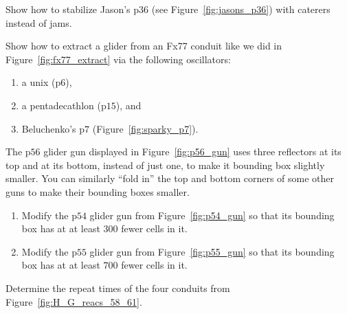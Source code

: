 \begin{multicols}{2}
\begin{problem}\label{exer:jasons_p36_caterer}
	Show how to stabilize Jason's p$36$ (see Figure~\ref{fig:jasons_p36}) with caterers instead of jams.
\end{problem}


\mfilbreak


\begin{problem}\label{exer:fx77_extract_other_osc}
	Show how to extract a glider from an Fx77 conduit like we did in Figure~\ref{fig:fx77_extract} via the following oscillators:
	
	\begin{enumerate}[label=\bf\color{ocre}(\alph*)]
		\item a unix (p$6$),
		
		\item a pentadecathlon (p$15$), and
		
		\item Beluchenko's p$7$ (Figure~\ref{fig:sparky_p7}).
	\end{enumerate}
\end{problem}


\mfilbreak


\begin{problem}\label{exer:p54_fold_corners}
	The p$56$ glider gun displayed in Figure~\ref{fig:p56_gun} uses three reflectors at its top and at its bottom, instead of just one, to make it bounding box slightly smaller. You can similarly ``fold in'' the top and bottom corners of some other guns to make their bounding boxes smaller.
	
	\begin{enumerate}[label=\bf\color{ocre}(\alph*)]
		\item Modify the p$54$ glider gun from Figure~\ref{fig:p54_gun} so that its bounding box has at at least $300$ fewer cells in it.
		
		\item Modify the p$55$ glider gun from Figure~\ref{fig:p55_gun} so that its bounding box has at at least $700$ fewer cells in it.
	\end{enumerate}
\end{problem}


\mfilbreak


\begin{problem}\label{exer:H_G_reacs_58_61}
	Determine the repeat times of the four conduits from Figure~\ref{fig:H_G_reacs_58_61}.
\end{problem}



\end{multicols}

